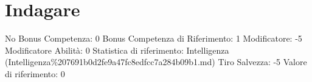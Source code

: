 \section{Indagare}\label{indagare}

\begin{description}
\tightlist
\item[Tags: ABI]
No Bonus Competenza: 0 Bonus Competenza di Riferimento: 1 Modificatore:
-5 Modificatore Abilità: 0 Statistica di riferimento: Intelligenza
(Intelligenza\%207691b0d2fe9a47fc8edfcc7a284b09b1.md) Tiro Salvezza: -5
Valore di riferimento: 0
\end{description}
